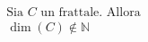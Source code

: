 \documentclass[preview]{standalone}
\begin{document}
\begin{align*}
\text{Sia } C \text{ un frattale. Allora} \\ \operatorname{dim}(C) \not \in \mathbb{N}
\end{align*}
\end{document}
